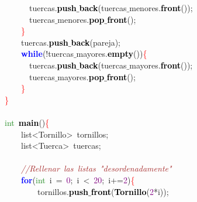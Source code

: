 \mbox{}\ \ \ \ \ \ tuercas\textcolor{BrickRed}{.}\textbf{\textcolor{Black}{push$\_$back}}\textcolor{BrickRed}{(}tuercas$\_$menores\textcolor{BrickRed}{.}\textbf{\textcolor{Black}{front}}\textcolor{BrickRed}{());} \\
\mbox{}\ \ \ \ \ \ tuercas$\_$menores\textcolor{BrickRed}{.}\textbf{\textcolor{Black}{pop$\_$front}}\textcolor{BrickRed}{();} \\
\mbox{}\ \ \ \ \textcolor{Red}{\}} \\
\mbox{}\ \ \ \ tuercas\textcolor{BrickRed}{.}\textbf{\textcolor{Black}{push$\_$back}}\textcolor{BrickRed}{(}pareja\textcolor{BrickRed}{);} \\
\mbox{}\ \ \ \ \textbf{\textcolor{Blue}{while}}\textcolor{BrickRed}{(!}tuercas$\_$mayores\textcolor{BrickRed}{.}\textbf{\textcolor{Black}{empty}}\textcolor{BrickRed}{())}\textcolor{Red}{\{} \\
\mbox{}\ \ \ \ \ \ tuercas\textcolor{BrickRed}{.}\textbf{\textcolor{Black}{push$\_$back}}\textcolor{BrickRed}{(}tuercas$\_$mayores\textcolor{BrickRed}{.}\textbf{\textcolor{Black}{front}}\textcolor{BrickRed}{());} \\
\mbox{}\ \ \ \ \ \ tuercas$\_$mayores\textcolor{BrickRed}{.}\textbf{\textcolor{Black}{pop$\_$front}}\textcolor{BrickRed}{();} \\
\mbox{}\ \ \ \ \textcolor{Red}{\}} \\
\mbox{}\textcolor{Red}{\}} \\
\mbox{} \\
\mbox{}\textcolor{ForestGreen}{int}\ \textbf{\textcolor{Black}{main}}\textcolor{BrickRed}{()}\textcolor{Red}{\{} \\
\mbox{}\ \ \ \ \textcolor{TealBlue}{list\textless{}Tornillo\textgreater{}}\ tornillos\textcolor{BrickRed}{;} \\
\mbox{}\ \ \ \ \textcolor{TealBlue}{list\textless{}Tuerca\textgreater{}}\ tuercas\textcolor{BrickRed}{;} \\
\mbox{} \\
\mbox{}\ \ \ \ \textit{\textcolor{Brown}{//Rellenar\ las\ listas\ "{}desordenadamente"{}}} \\
\mbox{}\ \ \ \ \textbf{\textcolor{Blue}{for}}\textcolor{BrickRed}{(}\textcolor{ForestGreen}{int}\ i\ \textcolor{BrickRed}{=}\ \textcolor{Purple}{0}\textcolor{BrickRed}{;}\ i\ \textcolor{BrickRed}{\textless{}}\ \textcolor{Purple}{20}\textcolor{BrickRed}{;}\ i\textcolor{BrickRed}{+=}\textcolor{Purple}{2}\textcolor{BrickRed}{)}\textcolor{Red}{\{} \\
\mbox{}\ \ \ \ \ \ \ \ tornillos\textcolor{BrickRed}{.}\textbf{\textcolor{Black}{push$\_$front}}\textcolor{BrickRed}{(}\textbf{\textcolor{Black}{Tornillo}}\textcolor{BrickRed}{(}\textcolor{Purple}{2}\textcolor{BrickRed}{*}i\textcolor{BrickRed}{));} \\
